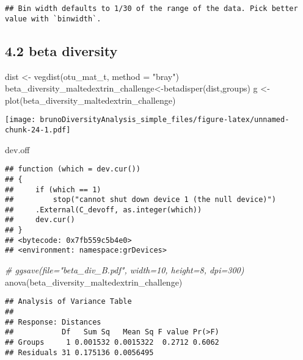 \documentclass[
]{article}
\newenvironment{Shaded}{\begin{snugshade}}{\end{snugshade}}
\newcommand{\AttributeTok}[1]{\textcolor[rgb]{0.77,0.63,0.00}{#1}}
\newcommand{\CommentTok}[1]{\textcolor[rgb]{0.56,0.35,0.01}{\textit{#1}}}
\newcommand{\FunctionTok}[1]{\textcolor[rgb]{0.00,0.00,0.00}{#1}}
\newcommand{\NormalTok}[1]{#1}
\newcommand{\OtherTok}[1]{\textcolor[rgb]{0.56,0.35,0.01}{#1}}
\newcommand{\StringTok}[1]{\textcolor[rgb]{0.31,0.60,0.02}{#1}}
\begin{document}
\begin{verbatim}
## Bin width defaults to 1/30 of the range of the data. Pick better value with `binwidth`.
\end{verbatim}

\hypertarget{beta-diversity-3}{%
\subsection{4.2 beta diversity}\label{beta-diversity-3}}

\begin{Shaded}
\begin{Highlighting}[]
\NormalTok{dist }\OtherTok{\textless{}{-}} \FunctionTok{vegdist}\NormalTok{(otu\_mat\_t, }\AttributeTok{method =} \StringTok{"bray"}\NormalTok{)}
\NormalTok{beta\_diversity\_maltedextrin\_challenge}\OtherTok{\textless{}{-}}\FunctionTok{betadisper}\NormalTok{(dist,groups)}
\NormalTok{g }\OtherTok{\textless{}{-}} \FunctionTok{plot}\NormalTok{(beta\_diversity\_maltedextrin\_challenge)}
\end{Highlighting}
\end{Shaded}

\texttt{[image: brunoDiversityAnalysis\_simple\_files/figure-latex/unnamed-chunk-24-1.pdf]}

\begin{Shaded}
\begin{Highlighting}[]
\NormalTok{dev.off}
\end{Highlighting}
\end{Shaded}

\begin{verbatim}
## function (which = dev.cur()) 
## {
##     if (which == 1) 
##         stop("cannot shut down device 1 (the null device)")
##     .External(C_devoff, as.integer(which))
##     dev.cur()
## }
## <bytecode: 0x7fb559c5b4e0>
## <environment: namespace:grDevices>
\end{verbatim}

\begin{Shaded}
\begin{Highlighting}[]
\CommentTok{\# ggsave(file="beta\_div\_B.pdf", width=10, height=8, dpi=300)}
\FunctionTok{anova}\NormalTok{(beta\_diversity\_maltedextrin\_challenge)}
\end{Highlighting}
\end{Shaded}

\begin{verbatim}
## Analysis of Variance Table
## 
## Response: Distances
##           Df   Sum Sq   Mean Sq F value Pr(>F)
## Groups     1 0.001532 0.0015322  0.2712 0.6062
## Residuals 31 0.175136 0.0056495
\end{verbatim}
\end{document}
